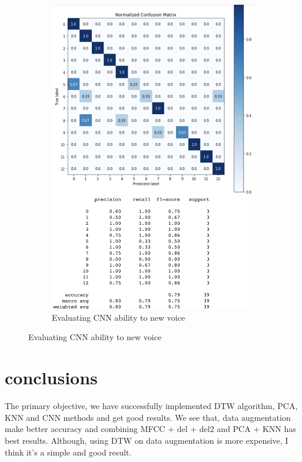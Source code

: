 \documentclass[%
  article,%
  10pt,%
  a4paper,%
  fleqn,%
  oneside,%
  sumario = tradicional,%
  chapter = TITLE,%
  section = TITLE,%
]{abntex2}
\begin{document}
\begin{figure}
\begin{minipage}[b]{.4\textwidth}
\begin{figure}[H]
  \includegraphics[width = \columnwidth]{./Figuras/cnnown}
   \caption{Evaluating CNN ability to new voice}
   \label{fig:cnnown}
\end{figure}
\end{minipage}
\end{figure}

\section{conclusions}
The primary objective, we have successfully implemented DTW algorithm, PCA, KNN and CNN methods and get good results. We see that, data augmentation make better accuracy and combining MFCC + del + del2 and PCA + KNN has best results. Although, using DTW on data augmentation is more expensive, I think it's a simple and good result.

\printbibliography%

\end{document}

